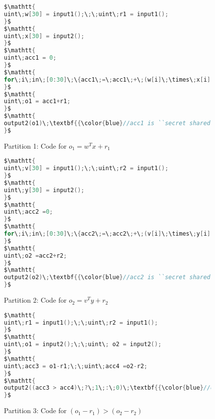 \begin{figure}
\begin{lstlisting}[language=C,mathescape=true]
$\mathtt{
uint\;w[30] = input1();\;\;uint\;r1 = input1();
}$
$\mathtt{
uint\;x[30] = input2();
}$
$\mathtt{
uint\;acc1 = 0;
}$
$\mathtt{
for\;i\;in\;[0:30]\;\{acc1\;=\;acc1\;+\;(w[i]\;\times\;x[i]);\}
}$
$\mathtt{
uint\;o1 = acc1+r1;
}$
$\mathtt{
output2(o1)\;\textbf{{\color{blue}//acc1 is ``secret shared''}}
}$
\end{lstlisting}
\caption{Partition 1: Code for $o_1 = w^Tx+r_1$}
\label{fig:codepartitioning1}
\end{figure}

\begin{figure}
\begin{lstlisting}[language=C,mathescape=true]
$\mathtt{
uint\;v[30] = input1();\;\;uint\;r2 = input1();
}$
$\mathtt{
uint\;y[30] = input2();
}$
$\mathtt{
uint\;acc2 =0;
}$
$\mathtt{
for\;i\;in\;[0:30]\;\{acc2\;=\;acc2\;+\;(v[i]\;\times\;y[i]);\;\}
}$
$\mathtt{
uint\;o2 =acc2+r2;
}$
$\mathtt{
output2(o2)\;\textbf{{\color{blue}//acc2 is ``secret shared''}}
}$
\end{lstlisting}
\caption{Partition 2: Code for $o_2 = v^Ty+r_2$}
\label{fig:codepartitioning2}
\end{figure}

\begin{figure}
\begin{lstlisting}[language=C,mathescape=true]
$\mathtt{
uint\;r1 = input1();\;\;uint\;r2 = input1();
}$
$\mathtt{
uint\;o1 = input2();\;\;uint\; o2 = input2();
}$
$\mathtt{
uint\;acc3 = o1-r1;\;\;uint\;acc4 =o2-r2;
}$
$\mathtt{
output2((acc3 > acc4)\;?\;1\;:\;0)\;\textbf{{\color{blue}//only to party 2}}
}$
\end{lstlisting}
\caption{Partition 3: Code for $(o_1-r_1)>(o_2-r_2)$}
\label{fig:codepartitioning3}
\end{figure}
